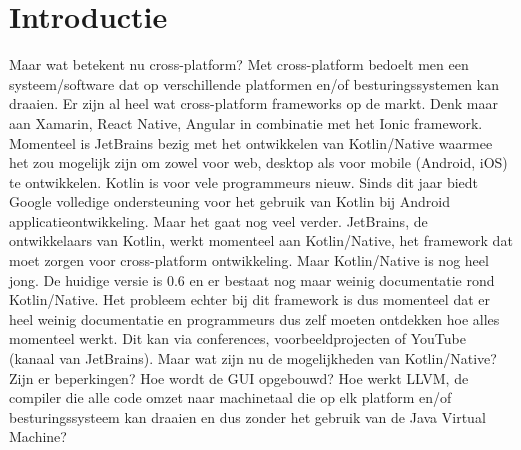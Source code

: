 	\section{Introductie} %
	\label{sec:introductie}
	
	Maar wat betekent nu cross-platform? Met cross-platform bedoelt men een systeem/software dat op verschillende platformen en/of besturingssystemen kan draaien. Er zijn al heel wat cross-platform frameworks op de markt. Denk maar aan Xamarin, React Native, Angular in combinatie met het Ionic framework. Momenteel is JetBrains bezig met het ontwikkelen van Kotlin/Native waarmee het zou mogelijk zijn om zowel voor web, desktop als voor mobile (Android, iOS) te ontwikkelen.
	\newline
	\newline
	Kotlin is voor vele programmeurs nieuw. Sinds dit jaar biedt Google volledige ondersteuning voor het gebruik van Kotlin bij Android applicatieontwikkeling. Maar het gaat nog veel verder. JetBrains, de ontwikkelaars van Kotlin, werkt momenteel aan Kotlin/Native, het framework dat moet zorgen voor cross-platform ontwikkeling. Maar Kotlin/Native is nog heel jong. De huidige versie is 0.6 en er bestaat nog maar weinig documentatie rond Kotlin/Native. Het probleem echter bij dit framework is dus momenteel dat er heel weinig documentatie en programmeurs dus zelf moeten ontdekken hoe alles momenteel werkt. Dit kan via conferences, voorbeeldprojecten of YouTube (kanaal van JetBrains). Maar wat zijn nu de mogelijkheden van Kotlin/Native? Zijn er beperkingen? Hoe wordt de GUI opgebouwd? Hoe werkt LLVM, de compiler die alle code omzet naar machinetaal die op elk platform en/of besturingssysteem kan draaien en dus zonder het gebruik van de Java Virtual Machine?
	
	
